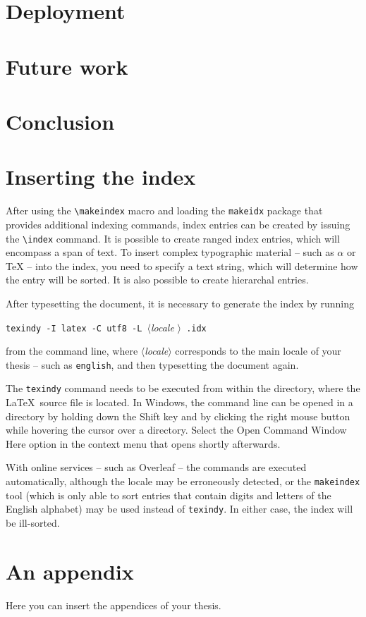 \documentclass[
  digital,     %
  oneside,     %
  nosansbold,  %
  nocolorbold, %
  lof,         %
  lot,         %
]{fithesis4}
\begin{document}
\chapter{Deployment}

\chapter{Future work}

\chapter{Conclusion}


  \printbibliography[heading=bibintoc] %

\chapter{Inserting the index}
After using the \verb"\makeindex" macro and loading the
\texttt{makeidx} package that provides additional indexing
commands, index entries can be created by issuing the \verb"\index"
command. It is possible to create ranged index
entries, which will encompass a span of text.
To insert complex typographic material -- such as $\alpha$
 or \TeX{}  --
into the index, you need to specify a text string, which will
determine how the entry will be sorted. It is also possible to
create hierarchal entries. 

After typesetting the document, it is necessary to generate the
index by running
\begin{center}%
  \texttt{texindy -I latex -C utf8 -L }$\langle$\textit{locale}%
  $\rangle$\texttt{ \jobname.idx}
\end{center}
from the command line, where $\langle$\textit{locale}$\rangle$
corresponds to the main locale of your thesis -- such as
\texttt{english}, and then typesetting the document again.

The \texttt{texindy} command needs to be executed from within the
directory, where the \LaTeX\ source file is located. In Windows,
the command line can be opened in a directory by holding down the
\textsf{Shift} key and by clicking the right mouse button while
hovering the cursor over a directory. Select the \textsf{Open Command
Window Here} option in the context menu that opens shortly
afterwards.

With online services -- such as Overleaf -- the commands are
executed automatically, although the locale may be erroneously
detected, or the \texttt{makeindex} tool (which is only able to
sort entries that contain digits and letters of the English
alphabet) may be used instead of \texttt{texindy}. In either case,
the index will be ill-sorted.

  \makeatletter\thesis@blocks@clear\makeatother
  \printindex


\appendix %
\chapter{An appendix}
Here you can insert the appendices of your thesis.
\end{document}
